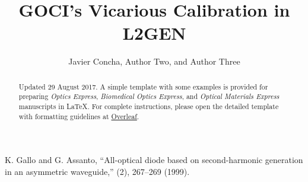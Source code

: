 \documentclass[10pt]{article}
\begin{document}
\title{GOCI's Vicarious Calibration in L2GEN}

\author{Javier Concha, Author Two, and Author Three}

\address{Peer Review, Publications Department, The Optical Society, 2010 Massachusetts Avenue NW, Washington, DC 20036, USA\\
Publications Department, The Optical Society, 2010 Massachusetts Avenue NW, Washington, DC 20036, USA\\
Currently with the Department of Electronic Journals, The Optical Society, 2010 Massachusetts Avenue NW, Washington, DC 20036, USA}




\begin{abstract}
Updated 29 August 2017. A simple template with some examples is provided for preparing \textit{Optics Express}, \textit{Biomedical Optics Express}, and \textit{Optical Materials Express} manuscripts in \LaTeX. For complete instructions, please open the detailed template with formatting guidelines at \href{http://www.overleaf.com/docs?template=osa-opex-guide}{Overleaf}.
\end{abstract}


\begin{thebibliography}{99}

 K. Gallo and G. Assanto, ``All-optical diode based on second-harmonic generation in an asymmetric waveguide,'' (2), 267--269 (1999).

\end{thebibliography}

\end{document}
